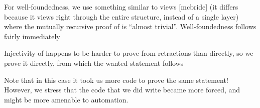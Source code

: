 For well-foundedness, we use something similar to views [mcbride] (it differs because it views right through the entire structure, instead of a single layer)
where the mutually recursive proof of  is ``almost trivial''. Well-foundedness follows fairly immediately

Injectivity of  happens to be harder to prove from retractions than directly, so we prove it directly, from which the wanted statement follows

Note that in this case it took us more code to prove the same statement! However, we stress that the code that we did write became more forced, and might be more amenable to automation.

